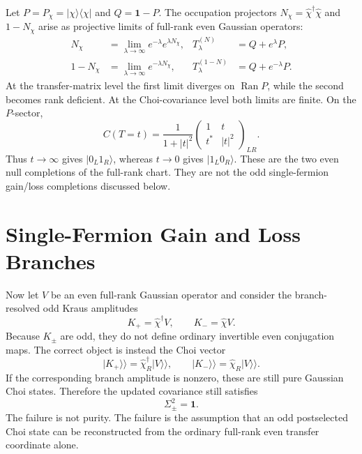 \documentclass[aps,prb,onecolumn,nofootinbib,superscriptaddress]{revtex4-2}
\newcommand{\I}{\mathbf{1}}
\newcommand{\Ran}{\operatorname{Ran}}
\newcommand{\ket}[1]{\lvert #1\rangle}
\newcommand{\bra}[1]{\langle #1\rvert}
\theoremstyle{plain}
\theoremstyle{definition}
\begin{document}
Let \(P=P_\chi=\ket{\chi}\bra{\chi}\) and \(Q=\I-P\).  The occupation
projectors \(N_\chi=\hat\chi^\dagger\hat\chi\) and \(1-N_\chi\) arise as
projective limits of full-rank even Gaussian operators:
\begin{align}
  N_\chi
  &=
  \lim_{\lambda\to\infty}
  e^{-\lambda}e^{\lambda N_\chi},
  &
  T_\lambda^{(N)}
  &=
  Q+e^\lambda P,
  \label{eq:N-projective}\\
  1-N_\chi
  &=
  \lim_{\lambda\to\infty}
  e^{-\lambda N_\chi},
  &
  T_\lambda^{(1-N)}
  &=
  Q+e^{-\lambda}P .
  \label{eq:one-minus-N-projective}
\end{align}
At the transfer-matrix level the first limit diverges on \(\Ran P\), while the
second becomes rank deficient.  At the Choi-covariance level both limits are
finite.  On the \(P\)-sector,
\begin{equation}
  C(T=t)
  =
  \frac{1}{1+|t|^2}
  \begin{pmatrix}
    1 & t\\
    t^* & |t|^2
  \end{pmatrix}_{LR}.
  \label{eq:one-mode-even-C}
\end{equation}
Thus \(t\to\infty\) gives
\(\ket{0_L1_R}\), whereas \(t\to0\) gives \(\ket{1_L0_R}\).  These are the
two even null completions of the full-rank chart.  They are not the odd
single-fermion gain/loss completions discussed below.

\section{Single-Fermion Gain and Loss Branches}

Now let \(V\) be an even full-rank Gaussian operator and consider the
branch-resolved odd Kraus amplitudes
\begin{equation}
  K_+=\hat\chi^\dagger V,
  \qquad
  K_-=\hat\chi V .
  \label{eq:odd-Kraus}
\end{equation}
Because \(K_\pm\) are odd, they do not define ordinary invertible even
conjugation maps.  The correct object is instead the Choi vector
\begin{equation}
  \ket{K_+}\!\rangle=\hat\chi_R^\dagger\ket{V}\!\rangle,
  \qquad
  \ket{K_-}\!\rangle=\hat\chi_R\ket{V}\!\rangle.
  \label{eq:odd-choi-vectors}
\end{equation}
If the corresponding branch amplitude is nonzero, these are still pure
Gaussian Choi states.  Therefore the updated covariance still satisfies
\begin{equation}
  \Sigma_\pm^2=\I .
  \label{eq:odd-purity}
\end{equation}
The failure is not purity.  The failure is the assumption that an odd
postselected Choi state can be reconstructed from the ordinary full-rank even
transfer coordinate alone.
\end{document}
